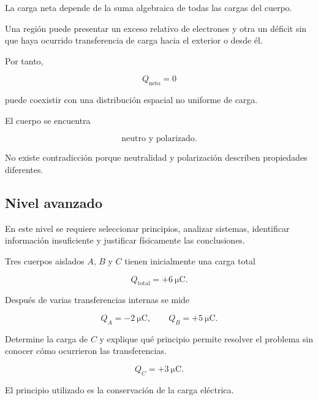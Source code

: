 \begin{explicacion}

La carga neta depende de la suma algebraica de todas las cargas del cuerpo.

Una región puede presentar un exceso relativo de electrones y otra un déficit
sin que haya ocurrido transferencia de carga hacia el exterior o desde él.

Por tanto,

\[
Q_{\text{neto}}=0
\]

puede coexistir con una distribución espacial no uniforme de carga.

El cuerpo se encuentra

\[
\boxed{
\text{neutro y polarizado}
}.
\]

No existe contradicción porque neutralidad y polarización describen
propiedades diferentes.

\end{explicacion}



\subsection{Nivel avanzado}

En este nivel se requiere seleccionar principios, analizar sistemas,
identificar información insuficiente y justificar físicamente las
conclusiones.



\begin{ejercicio}

Tres cuerpos aislados \(A\), \(B\) y \(C\) tienen inicialmente una carga
total

\[
Q_{\text{total}}=+\SI{6}{\micro\coulomb}.
\]

Después de varias transferencias internas se mide

\[
Q_A=-\SI{2}{\micro\coulomb},
\qquad
Q_B=+\SI{5}{\micro\coulomb}.
\]

Determine la carga de \(C\) y explique qué principio permite resolver el
problema sin conocer cómo ocurrieron las transferencias.

\end{ejercicio}

\begin{respuesta}

\[
\boxed{
Q_C=+\SI{3}{\micro\coulomb}
}.
\]

El principio utilizado es la conservación de la carga eléctrica.

\end{respuesta}

